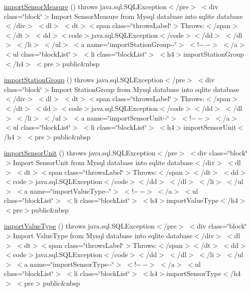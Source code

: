 \begin{DoxyCompactItemize}
\item 
\hyperlink{_my_s_q_l_connector_8html_a1939916ce4a6a306fb8175167d171adb}{import\-Sensor\-Measure} ()  throws java.\-sql.\-S\-Q\-L\-Exception$<$/pre$>$ $<$div class=\char`\"{}block\char`\"{}$>$\-Import Sensor\-Measure from Mysql database into sqlite database$<$/div$>$ $<$dl$>$ $<$dt$>$$<$span class=\char`\"{}throws\-Label\char`\"{}$>$\-Throws\-:$<$/span$>$$<$/dt$>$ $<$dd$>$$<$code$>$java.\-sql.\-S\-Q\-L\-Exception$<$/code$>$$<$/dd$>$ $<$/dl$>$ $<$/li$>$ $<$/ul$>$ $<$a name=\char`\"{}import\-Station\-Group-\/-\/\char`\"{}$>$ $<$!-\/-\/   -\/-\/$>$ $<$/a$>$ $<$ul class=\char`\"{}block\-List\char`\"{}$>$ $<$li class=\char`\"{}block\-List\char`\"{}$>$ $<$h4$>$import\-Station\-Group$<$/h4$>$ $<$pre$>$public\&nbsp
\item 
\hyperlink{_my_s_q_l_connector_8html_a57979ae63696cb2637b1577cb585f30d}{import\-Station\-Group} ()  throws java.\-sql.\-S\-Q\-L\-Exception$<$/pre$>$ $<$div class=\char`\"{}block\char`\"{}$>$\-Import Station\-Group from Mysql database into sqlite database$<$/div$>$ $<$dl$>$ $<$dt$>$$<$span class=\char`\"{}throws\-Label\char`\"{}$>$\-Throws\-:$<$/span$>$$<$/dt$>$ $<$dd$>$$<$code$>$java.\-sql.\-S\-Q\-L\-Exception$<$/code$>$$<$/dd$>$ $<$/dl$>$ $<$/li$>$ $<$/ul$>$ $<$a name=\char`\"{}import\-Sensor\-Unit-\/-\/\char`\"{}$>$ $<$!-\/-\/   -\/-\/$>$ $<$/a$>$ $<$ul class=\char`\"{}block\-List\char`\"{}$>$ $<$li class=\char`\"{}block\-List\char`\"{}$>$ $<$h4$>$import\-Sensor\-Unit$<$/h4$>$ $<$pre$>$public\&nbsp
\item 
\hyperlink{_my_s_q_l_connector_8html_a178f69d7ff883fa5560452a4ff2640af}{import\-Sensor\-Unit} ()  throws java.\-sql.\-S\-Q\-L\-Exception$<$/pre$>$ $<$div class=\char`\"{}block\char`\"{}$>$\-Import Sensor\-Unit from Mysql database into sqlite database$<$/div$>$ $<$dl$>$ $<$dt$>$$<$span class=\char`\"{}throws\-Label\char`\"{}$>$\-Throws\-:$<$/span$>$$<$/dt$>$ $<$dd$>$$<$code$>$java.\-sql.\-S\-Q\-L\-Exception$<$/code$>$$<$/dd$>$ $<$/dl$>$ $<$/li$>$ $<$/ul$>$ $<$a name=\char`\"{}import\-Value\-Type-\/-\/\char`\"{}$>$ $<$!-\/-\/   -\/-\/$>$ $<$/a$>$ $<$ul class=\char`\"{}block\-List\char`\"{}$>$ $<$li class=\char`\"{}block\-List\char`\"{}$>$ $<$h4$>$import\-Value\-Type$<$/h4$>$ $<$pre$>$public\&nbsp
\item 
\hyperlink{_my_s_q_l_connector_8html_a78eb2e60f43bb695194f55c8d8495ded}{import\-Value\-Type} ()  throws java.\-sql.\-S\-Q\-L\-Exception$<$/pre$>$ $<$div class=\char`\"{}block\char`\"{}$>$\-Import Value\-Type from Mysql database into sqlite database$<$/div$>$ $<$dl$>$ $<$dt$>$$<$span class=\char`\"{}throws\-Label\char`\"{}$>$\-Throws\-:$<$/span$>$$<$/dt$>$ $<$dd$>$$<$code$>$java.\-sql.\-S\-Q\-L\-Exception$<$/code$>$$<$/dd$>$ $<$/dl$>$ $<$/li$>$ $<$/ul$>$ $<$a name=\char`\"{}import\-Sensor\-Type-\/-\/\char`\"{}$>$ $<$!-\/-\/   -\/-\/$>$ $<$/a$>$ $<$ul class=\char`\"{}block\-List\char`\"{}$>$ $<$li class=\char`\"{}block\-List\char`\"{}$>$ $<$h4$>$import\-Sensor\-Type$<$/h4$>$ $<$pre$>$public\&nbsp

\end{DoxyCompactItemize}
